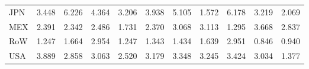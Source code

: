 \begin{table}[htbp]
\begin{tabular}{lcccccccccc}
  JPN & \textcolor[RGB]{110,71,145}{3.448} & \textcolor[RGB]{23,15,232}{6.226} & \textcolor[RGB]{69,45,186}{4.364} & \textcolor[RGB]{128,82,128}{3.206} & \textcolor[RGB]{84,54,171}{3.938} & \textcolor[RGB]{51,33,204}{5.105} & \textcolor[RGB]{217,140,38}{1.572} & \textcolor[RGB]{28,18,227}{6.178} & \textcolor[RGB]{125,81,130}{3.219} & \textcolor[RGB]{204,132,51}{2.069} \\ 
  MEX & \textcolor[RGB]{191,124,64}{2.391} & \textcolor[RGB]{196,127,59}{2.342} & \textcolor[RGB]{184,119,71}{2.486} & \textcolor[RGB]{209,135,46}{1.731} & \textcolor[RGB]{194,125,61}{2.370} & \textcolor[RGB]{138,89,117}{3.068} & \textcolor[RGB]{135,87,120}{3.113} & \textcolor[RGB]{235,152,20}{1.295} & \textcolor[RGB]{97,63,158}{3.668} & \textcolor[RGB]{168,109,87}{2.837} \\ 
  RoW & \textcolor[RGB]{240,155,15}{1.247} & \textcolor[RGB]{212,137,43}{1.664} & \textcolor[RGB]{148,96,107}{2.954} & \textcolor[RGB]{237,153,18}{1.247} & \textcolor[RGB]{232,150,23}{1.343} & \textcolor[RGB]{222,144,33}{1.434} & \textcolor[RGB]{214,139,41}{1.639} & \textcolor[RGB]{150,97,105}{2.951} & \textcolor[RGB]{252,163,3}{0.846} & \textcolor[RGB]{250,162,5}{0.940} \\ 
  USA & \textcolor[RGB]{87,56,168}{3.889} & \textcolor[RGB]{161,104,94}{2.858} & \textcolor[RGB]{140,91,115}{3.063} & \textcolor[RGB]{178,115,76}{2.520} & \textcolor[RGB]{130,84,125}{3.179} & \textcolor[RGB]{115,74,140}{3.348} & \textcolor[RGB]{122,79,133}{3.245} & \textcolor[RGB]{112,73,143}{3.424} & \textcolor[RGB]{145,94,110}{3.034} & \textcolor[RGB]{227,147,28}{1.377} \\ 
   \hline
\end{tabular}
\end{table}
